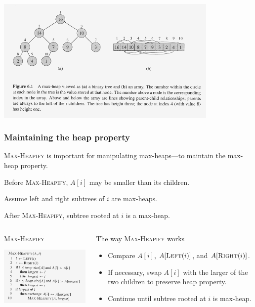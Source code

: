 \documentclass[notes,serif]{beamer}
\begin{document}
\begin{frame}
  \begin{block}{}
    \includegraphics[height=6.1cm]{06-fig-max-heap}
  \end{block}
\end{frame}

\begin{frame}
\frametitle{Maintaining the heap property}
  \textsc{Max-Heapify} is important for manipulating max-heaps---to maintain the max-heap property.
  \begin{block}{}
    \begin{itemize}
      {\small
      \item Before \textsc{Max-Heapify}, $A[i]$ may be smaller than its children.
      \item Assume left and right subtrees of $i$ are max-heaps.
      \item After \textsc{Max-Heapify}, subtree rooted at $i$ is a max-heap.
      }
    \end{itemize}
  \end{block}
\begin{columns}
  \begin{block}{\textsc{\small Max-Heapify}}
    \includegraphics[height=3.5cm]{06-max_heapify}
  \end{block}

  \begin{block}{\small The way \textsc{Max-Heapify} works}
  { \small 
  \begin{itemize}
    \item Compare $A[i]$, $A[\textsc{Left}(i)]$, and $A[\textsc{Right}(i )]$.
    \item If necessary, swap $A[i]$ with the larger of the two children to preserve heap property.
    \item Continue until subtree rooted at $i$ is max-heap.
  \end{itemize}
  }
  \end{block}
\end{columns}
\end{frame}
\end{document}
